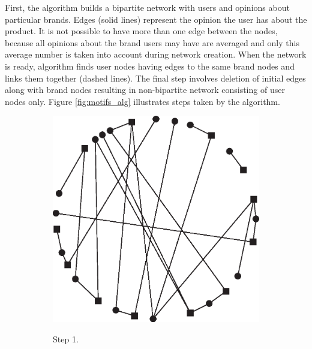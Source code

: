       First, the algorithm builds a bipartite network with users and opinions about particular brands. Edges (solid lines) represent the opinion the user has about the product. It is not possible to have more than one edge between the nodes, because all opinions about the brand users may have are averaged and only this average number is taken into account during network creation. When the network is ready, algorithm finds user nodes having edges to the same brand nodes and links them together (dashed lines). The final step involves deletion of initial edges along with brand nodes resulting in non-bipartite network consisting of user nodes only. Figure \ref{fig:motifs_alg} illustrates steps taken by the algorithm.
      \begin{figure}[h]
        \centering
        \begin{subfigure}[b]{0.3\textwidth}
          \includegraphics[width=\textwidth]{chapters/03_implementation/cs_motif_1}
          \label{fig:motifs_alg_1}
          \caption{Step 1.}
        \end{subfigure}
        \quad
        \begin{subfigure}[b]{0.3\textwidth}

\end{subfigure}
\end{figure}

